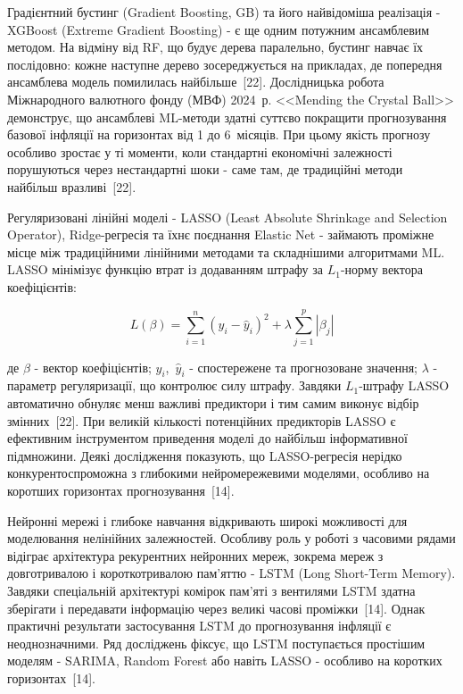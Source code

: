 \documentclass[a4paper,ukrainian,oneside]{extreport}
\begin{document}
Градієнтний бустинг (Gradient Boosting, GB) та його найвідоміша реалізація - XGBoost (Extreme Gradient Boosting) - є ще одним потужним ансамблевим методом. На відміну від RF, що будує дерева паралельно, бустинг навчає їх послідовно: кожне наступне дерево зосереджується на прикладах, де попередня ансамблева модель помилилась найбільше~[22]. Дослідницька робота Міжнародного валютного фонду (МВФ) 2024~р. <<Mending the Crystal Ball>> демонструє, що ансамблеві ML-методи здатні суттєво покращити прогнозування базової інфляції на горизонтах від 1 до 6~місяців. При цьому якість прогнозу особливо зростає у ті моменти, коли стандартні економічні залежності порушуються через нестандартні шоки - саме там, де традиційні методи найбільш вразливі~[22].

Регуляризовані лінійні моделі - LASSO (Least Absolute Shrinkage and Selection Operator), Ridge-регресія та їхнє поєднання Elastic Net - займають проміжне місце між традиційними лінійними методами та складнішими алгоритмами ML. LASSO мінімізує функцію втрат із додаванням штрафу за $L_1$-норму вектора коефіцієнтів:

\begin{equation}
L(\beta) = \sum_{i=1}^{n}(y_i - \hat{y}_i)^2 + \lambda\sum_{j=1}^{p}|\beta_j|
\end{equation}

де $\beta$ - вектор коефіцієнтів; $y_i$,~$\hat{y}_i$ - спостережене та прогнозоване значення; $\lambda$ - параметр регуляризації, що контролює силу штрафу. Завдяки $L_1$-штрафу LASSO автоматично обнуляє менш важливі предиктори і тим самим виконує відбір змінних~[22]. При великій кількості потенційних предикторів LASSO є ефективним інструментом приведення моделі до найбільш інформативної підмножини. Деякі дослідження показують, що LASSO-регресія нерідко конкурентоспроможна з глибокими нейромережевими моделями, особливо на коротших горизонтах прогнозування~[14].

Нейронні мережі і глибоке навчання відкривають широкі можливості для моделювання нелінійних залежностей. Особливу роль у роботі з часовими рядами відіграє архітектура рекурентних нейронних мереж, зокрема мереж з довготривалою і короткотривалою пам'яттю - LSTM (Long Short-Term Memory). Завдяки спеціальній архітектурі комірок пам'яті з вентилями LSTM здатна зберігати і передавати інформацію через великі часові проміжки~[14]. Однак практичні результати застосування LSTM до прогнозування інфляції є неоднозначними. Ряд досліджень фіксує, що LSTM поступається простішим моделям - SARIMA, Random Forest або навіть LASSO - особливо на коротких горизонтах~[14].
\end{document}
